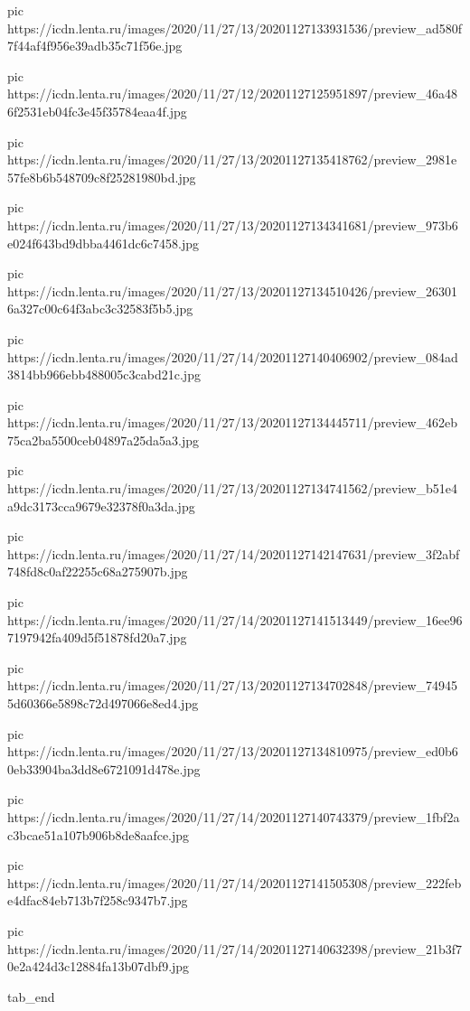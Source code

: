 pic https://icdn.lenta.ru/images/2020/11/27/13/20201127133931536/preview_ad580f7f44af4f956e39adb35c71f56e.jpg

pic https://icdn.lenta.ru/images/2020/11/27/12/20201127125951897/preview_46a486f2531eb04fc3e45f35784eaa4f.jpg

pic https://icdn.lenta.ru/images/2020/11/27/13/20201127135418762/preview_2981e57fe8b6b548709c8f25281980bd.jpg

pic https://icdn.lenta.ru/images/2020/11/27/13/20201127134341681/preview_973b6e024f643bd9dbba4461dc6c7458.jpg

pic https://icdn.lenta.ru/images/2020/11/27/13/20201127134510426/preview_263016a327c00c64f3abc3c32583f5b5.jpg

pic https://icdn.lenta.ru/images/2020/11/27/14/20201127140406902/preview_084ad3814bb966ebb488005c3cabd21c.jpg

pic https://icdn.lenta.ru/images/2020/11/27/13/20201127134445711/preview_462eb75ca2ba5500ceb04897a25da5a3.jpg

pic https://icdn.lenta.ru/images/2020/11/27/13/20201127134741562/preview_b51e4a9dc3173cca9679e32378f0a3da.jpg

pic https://icdn.lenta.ru/images/2020/11/27/14/20201127142147631/preview_3f2abf748fd8c0af22255c68a275907b.jpg

pic https://icdn.lenta.ru/images/2020/11/27/14/20201127141513449/preview_16ee967197942fa409d5f51878fd20a7.jpg

pic https://icdn.lenta.ru/images/2020/11/27/13/20201127134702848/preview_749455d60366e5898c72d497066e8ed4.jpg

pic https://icdn.lenta.ru/images/2020/11/27/13/20201127134810975/preview_ed0b60eb33904ba3dd8e6721091d478e.jpg

pic https://icdn.lenta.ru/images/2020/11/27/14/20201127140743379/preview_1fbf2ac3bcae51a107b906b8de8aafce.jpg

pic https://icdn.lenta.ru/images/2020/11/27/14/20201127141505308/preview_222febe4dfac84eb713b7f258c9347b7.jpg

pic https://icdn.lenta.ru/images/2020/11/27/14/20201127140632398/preview_21b3f70e2a424d3c12884fa13b07dbf9.jpg

tab_end
\fi
